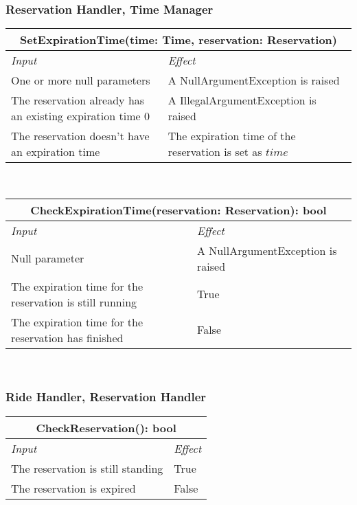 		
		
		\subsubsection*{Reservation Handler, Time Manager}
			\begin{tabular}{ |l|l| }
				\hline
				\multicolumn{2}{|c|}{SetExpirationTime(time: Time, reservation: Reservation)}\\
				\hline
				\textit{Input} & \textit{Effect}\\ \hline
				One or more null parameters & A NullArgumentException is raised\\ \hline
				The reservation already has an existing expiration time 0& A IllegalArgumentException is raised \\ \hline %
				The reservation doesn't have an expiration time & The expiration time of the reservation is set as $time$\\ \hline
			\end{tabular}
			\\
			\begin{tabular}{ |l|l| }
				\hline
				\multicolumn{2}{|c|}{CheckExpirationTime(reservation: Reservation): bool}\\
				\hline
				\textit{Input} & \textit{Effect}\\ \hline
				Null parameter & A NullArgumentException is raised\\ \hline
				The expiration time for the reservation is still running & True\\ \hline
				The expiration time for the reservation has finished & False\\ \hline
			\end{tabular}
			\\
		
		
		
		\subsubsection*{Ride Handler, Reservation Handler}
			\begin{tabular}{ |l|l| }
				\hline
				\multicolumn{2}{|c|}{CheckReservation(): bool}\\
				\hline
				\textit{Input} & \textit{Effect}\\ \hline
				The reservation is still standing & True\\ \hline
				The reservation is expired & False\\ \hline
			\end{tabular}
			\\
		
